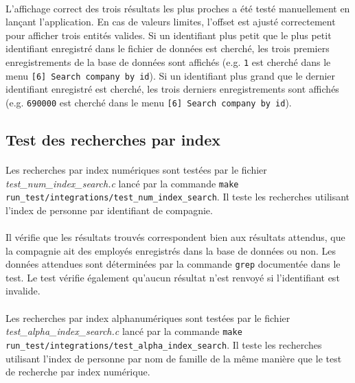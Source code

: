\documentclass{article}
\begin{document}
    \paragraph{}
    L'affichage correct des trois résultats les plus proches a été testé manuellement en lançant l'application. En cas de valeurs limites, l'offset est ajusté correctement pour afficher trois entités valides. Si un identifiant plus petit que le plus petit identifiant enregistré dans le fichier de données est cherché, les trois premiers enregistrements de la base de données sont affichés (e.g. \texttt{1} est cherché dans le menu \texttt{[6] Search company by id}). Si un identifiant plus grand que le dernier identifiant enregistré est cherché, les trois derniers enregistrements sont affichés (e.g. \texttt{690000} est cherché dans le menu \texttt{[6] Search company by id}).


    \subsection{Test des recherches par index}
    \paragraph{}
    Les recherches par index numériques sont testées par le fichier \emph{test\_num\_index\_search.c} lancé par la commande \texttt{make run\_test/integrations/test\_num\_index\_search}. Il teste les recherches utilisant l'index de personne par identifiant de compagnie.

    \paragraph{}
    Il vérifie que les résultats trouvés correspondent bien aux résultats attendus, que la compagnie ait des employés enregistrés dans la base de données ou non. Les données attendues sont déterminées par la commande \texttt{grep} documentée dans le test. Le test vérifie également qu'aucun résultat n'est renvoyé si l'identifiant est invalide.

    \paragraph{}
    Les recherches par index alphanumériques sont testées par le fichier \emph{test\_alpha\_index\_search.c} lancé par la commande \texttt{make run\_test/integrations/test\_alpha\_index\_search}. Il teste les recherches utilisant l'index de personne par nom de famille de la même manière que le test de recherche par index numérique.
\end{document}
